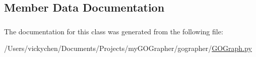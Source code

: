 \subsection{Member Data Documentation}
\hypertarget{class_g_o_graph_1_1_g_o_graph_af17f1eca2d2734e36976754e8ad4582a}{
\subsubsection[{namespace}]{}}
\label{class_g_o_graph_1_1_g_o_graph_af17f1eca2d2734e36976754e8ad4582a}


The documentation for this class was generated from the following file:\begin{DoxyCompactItemize}
\item 
/Users/vickychen/Documents/Projects/myGOGrapher/gographer/\hyperlink{_g_o_graph_8py}{GOGraph.py}\end{DoxyCompactItemize}
